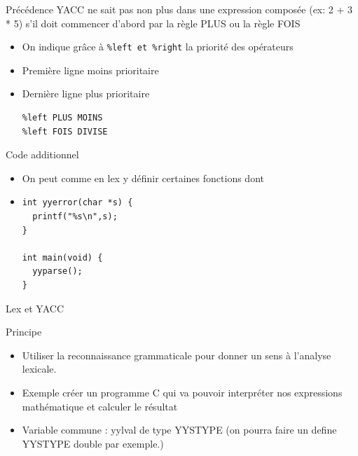\begin{frame}[containsverbatim]{\ftitle}
\def\blocktitle{Précédence}
\begin{block}{\blocktitle}
YACC ne sait pas non plus dans une expression composée (ex: 2 + 3 * 5) s'il doit commencer d'abord par la règle PLUS ou la règle FOIS
\begin{itemize}
\item On indique grâce à \verb!%left et %right! la priorité des opérateurs
\item Première ligne moins prioritaire
\item Dernière ligne plus prioritaire
\begin{verbatim}
%left PLUS MOINS
%left FOIS DIVISE
\end{verbatim}
\end{itemize}
\end{block}
\end{frame}


\begin{frame}[containsverbatim]{\ftitle}
\def\blocktitle{Code additionnel}
\begin{block}{\blocktitle}
\begin{itemize}
\item On peut comme en lex y définir certaines fonctions dont
\item \begin{verbatim}
int yyerror(char *s) {
  printf("%s\n",s);
}

int main(void) {
  yyparse();
}
\end{verbatim}
\end{itemize}
\end{block}
\end{frame}




\def\ftitle{Lex et YACC}
\begin{frame}[containsverbatim]{\ftitle}
\def\blocktitle{Principe}
\begin{block}{\blocktitle}
\begin{itemize}
\item Utiliser la reconnaissance grammaticale pour donner un sens à l'analyse lexicale.
\item Exemple créer un programme C qui va pouvoir interpréter nos expressions mathématique et calculer le résultat
\item Variable commune : yylval de type YYSTYPE (on pourra faire un define YYSTYPE double par exemple.)
\end{itemize}
\end{block}
\end{frame}


